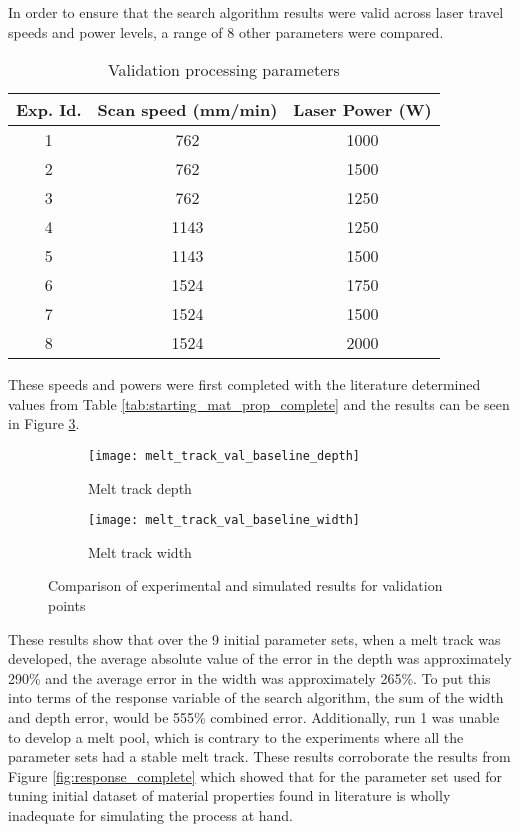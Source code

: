\label{validation}

In order to ensure that the search algorithm results were valid across laser travel speeds and power levels, a range of 8 other parameters were compared.


\begin{table}[!htb]
	\centering
	\caption{Validation processing parameters}
	\label{tab:val_parameters}
		\begin{tabular}{|c|c|c|} \hline 
			Exp. Id. & Scan speed (mm/min) & Laser Power (W) \\ \hline
			1 & 762 & 1000 \\ \hline  %
			2 & 762 & 1500 \\ \hline  %
			3 & 762 & 1250 \\ \hline  %
			4 & 1143 & 1250 \\ \hline %
			5 & 1143 & 1500 \\ \hline  %
			6 & 1524 & 1750 \\ \hline  %
			7 & 1524 & 1500 \\ \hline  %
			8 & 1524 & 2000 \\ \hline  %
		\end{tabular}
\end{table}

These speeds and powers were first completed with the literature determined values from Table \ref{tab:starting_mat_prop_complete} and the results can be seen in Figure \ref{fig:melt_track_val_baseline}.
\begin{figure}[!htb]\centering
	\begin{subfigure}[c]{0.45\textwidth}\centering
	\texttt{[image: melt\_track\_val\_baseline\_depth]}
	\caption{Melt track depth}
	\label{fig:melt_track_val_baseline_depth}
	\end{subfigure}\hfill{}
		\begin{subfigure}[c]{0.45\textwidth}\centering
		\texttt{[image: melt\_track\_val\_baseline\_width]}
		\caption{Melt track width}
		\label{fig:melt_track_val_baseline_width}
		\end{subfigure}
	\caption{Comparison of experimental and simulated results for validation points}
	\label{fig:melt_track_val_baseline}
\end{figure}
These results show that over the 9 initial parameter sets, when a melt track was developed, the average absolute value of the error in the depth was approximately 290\% and the average error in the width was approximately 265\%.  To put this into terms of the response variable of the search algorithm, the sum of the width and depth error, would be 555\% combined error.
Additionally, run 1 was unable to develop a melt pool, which is contrary to the experiments where all the parameter sets had a stable melt track.  These results corroborate the results from Figure \ref{fig:response_complete} which showed that for the parameter set used for tuning initial dataset of material properties found in literature is wholly inadequate for simulating the process at hand. 


